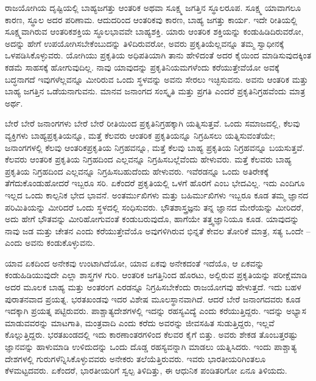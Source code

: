 \vskip 5pt

ರಾಜಯೋಗಿಯ ದೃಷ್ಟಿಯಲ್ಲಿ ಬಾಹ್ಯಜಗತ್ತು ಆಂತರಿಕ ಅಥವಾ ಸೂಕ್ಷ್ಮ ಜಗತ್ತಿನ ಸ್ಥೂಲರೂಪ. ಸೂಕ್ಷ್ಮ ಯಾವಾಗಲೂ ಕಾರಣ, ಸ್ಥೂಲ ಅದರ ಪರಿಣಾಮ. ಆದುದರಿಂದ ಆಂತರಿಕವು ಕಾರಣ, ಬಾಹ್ಯ ಜಗತ್ತು ಕಾರ್ಯ. ಇದೇ ರೀತಿಯಲ್ಲಿ ಸೂಕ್ಷ್ಮವಾಗಿರುವ ಆಂತರಿಕಶಕ್ತಿಯ ಸ್ಥೂಲಭಾವವೇ ಬಾಹ್ಯಶಕ್ತಿ. ಯಾರು ಆಂತರಿಕ ಶಕ್ತಿಯನ್ನು ಕಂಡುಹಿಡಿದಿರುವರೋ, ಅದನ್ನು ಹೇಗೆ ಉಪಯೋಗಿಸಬೇಕೆಂಬುದನ್ನು ತಿಳಿದಿರುವರೋ, ಅವರು ಪ್ರಕೃತಿಯೆಲ್ಲವನ್ನೂ ತಮ್ಮ ಸ್ವಾಧೀನಕ್ಕೆ ಒಳಪಡಿಸಿಕೊಳ್ಳುವರು. ಯೋಗಿಯು ಪ್ರಕೃತಿಯ ಅಧಿಪತಿಯಾಗಿ ತಾನು ಹೇಳಿದಂತೆ ಅದರ ಕೈಯಿಂದ ಮಾಡಿಸುವುದಕ್ಕಿಂತ ಕಡಮೆ ಸಾಹಸಕ್ಕೆ ಹೋಗುವುದಿಲ್ಲ. ನಾವು ಯಾವುದನ್ನು ಪ್ರಕೃತಿನಿಯಮಗಳೆಂದು ಕರೆಯುತ್ತೇವೆಯೋ ಅವಕ್ಕೆ ಬದ್ಧನಾಗದೆ ಇವುಗಳೆಲ್ಲವನ್ನೂ ಮೀರಿರುವ ಒಂದು ಸ್ಥಳವನ್ನು ಅವನು ಸೇರಲು ಇಚ್ಛಿಸುವನು. ಅವನು ಆಂತರಿಕ ಮತ್ತು ಬಾಹ್ಯ ಜಗತ್ತಿನ ಒಡೆಯನಾಗುವನು. ಮಾನವ ಜನಾಂಗದ ಸಂಸ್ಕೃತಿ ಮತ್ತು ಪ್ರಗತಿ ಎಂದರೆ ಪ್ರಕೃತಿನಿಗ್ರಹವೆಂದು ಮಾತ್ರ ಅರ್ಥ. 

\vskip 6pt

ಬೇರೆ ಬೇರೆ ಜನಾಂಗಗಳು ಬೇರೆ ಬೇರೆ ರೀತಿಯಿಂದ ಪ್ರಕೃತಿನಿಗ್ರಹಕ್ಕಾಗಿ ಯತ್ನಿಸುತ್ತವೆ. ಒಂದು ಸಮಾಜದಲ್ಲಿ, ಕೆಲವು ವ್ಯಕ್ತಿಗಳು ಬಾಹ್ಯಪ್ರಕೃತಿಯನ್ನೂ, ಮತ್ತೆ ಕೆಲವರು ಆಂತರಿಕ ಪ್ರಕೃತಿಯನ್ನೂ ನಿಗ್ರಹಿಸಲು ಯತ್ನಿಸುವಂತೆಯೇ; ಜನಾಂಗಗಳಲ್ಲಿ ಕೆಲವು ಆಂತರಿಕಪ್ರಕೃತಿಯ ನಿಗ್ರಹವನ್ನೂ, ಮತ್ತೆ ಕೆಲವು ಬಾಹ್ಯ ಪ್ರಕೃತಿಯ ನಿಗ್ರಹವನ್ನೂ ಬಯಸುತ್ತವೆ. ಕೆಲವರು ಆಂತರಿಕ ಪ್ರಕೃತಿಯ ನಿಗ್ರಹದಿಂದ ಎಲ್ಲವನ್ನೂ ನಿಗ್ರಹಿಸಬಲ್ಲೆವೆಂದು ಹೇಳುವರು. ಮತ್ತೆ ಕೆಲವರು ಬಾಹ್ಯ ಪ್ರಕೃತಿಯ ನಿಗ್ರಹದಿಂದ ಎಲ್ಲವನ್ನೂ ನಿಗ್ರಹಿಸಬಹುದೆಂದು ಹೇಳುವರು. ಇವೆರಡನ್ನೂ ಒಂದು ಅತಿರೇಕಕ್ಕೆ ತೆಗೆದುಕೊಂಡುಹೋದರೆ ಇಬ್ಬರೂ ಸರಿ. ಏಕೆಂದರೆ ಪ್ರಕೃತಿಯಲ್ಲಿ ಒಳಗೆ ಹೊರಗೆ ಎಂಬ ಭೇದವಿಲ್ಲ. ಇದು ಎಂದಿಗೂ ಇಲ್ಲದ ಒಂದು ಕಾಲ್ಪನಿಕ ಭೇದ ಭಾವನೆ. ಅಂತರ್ಮುಖಿಗಳು ಮತ್ತು ಬಹಿರ್ಮುಖಿಗಳು ಇಬ್ಬರೂ ಕೂಡ ತಮ್ಮ ಜ್ಞಾನದ ಪರಿಮಿತಿಯನ್ನು ಮೀರಿದರೆ ಒಂದು ಸ್ಥಳದಲ್ಲಿ ಸಂಧಿಸುವರು. ಭೌತಶಾಸ್ತ್ರಜ್ಞನು ತನ್ನ ಜ್ಞಾನದ ಮೇರೆಯನ್ನು ಮೀರಿದರೆ, ಅದು ಹೇಗೆ ಭೌತವನ್ನು ಮೀರಿಹೋಗುವಂತೆ ಕಂಡುಬರುವುದೊ, ಹಾಗೆಯೇ ತತ್ತ್ವಜ್ಞಾನಿಯೂ ಕೂಡ. ಯಾವುದನ್ನು ನಾವು ಜಡ ಮತ್ತು ಚೇತನ ಎಂದು ಕರೆಯುತ್ತೇವೆಯೊ ಅವುಗಳಿಗಿರುವ ಭಿನ್ನತೆ ಕೇವಲ ತೋರಿಕೆ ಮಾತ್ರ, ಸತ್ಯ ಒಂದೇ – ಎಂದು ಅವನು ಕಂಡುಕೊಳ್ಳುವನು. 

\vskip 6pt

ಯಾವ ಏಕದಿಂದ ಅನೇಕವು ಉಂಟಾಗಿದೆಯೋ, ಯಾವ ಏಕವು ಅನೇಕದಂತೆ ಇದೆಯೊ, ಆ ಏಕವನ್ನು ಕಂಡುಹಿಡಿಯುವುದೇ ಎಲ್ಲಾ ಶಾಸ್ತ್ರಗಳ ಗುರಿ. ಆಂತರಿಕ ಜಗತ್ತಿನಿಂದ ಹೊರಟು, ಅಲ್ಲಿರುವ ಪ್ರಕೃತಿಯನ್ನು ಪರೀಕ್ಷೆಮಾಡಿ ಅದರ ಮೂಲಕ ಬಾಹ್ಯ ಮತ್ತು ಅಂತರಂಗ ಎರಡನ್ನೂ ನಿಗ್ರಹಿಸಬೇಕೆಂದು ರಾಜಯೋಗವು ಹೇಳುತ್ತದೆ. ಇದು ಬಹಳ ಪುರಾತನವಾದ ಪ್ರಯತ್ನ. ಭರತಖಂಡವು ಇದರ ವಿಶೇಷ ಮೂಲಸ್ಥಾನವಾಗಿದೆ. ಆದರೆ ಬೇರೆ ಜನಾಂಗದವರು ಕೂಡ ಇದಕ್ಕಾಗಿ ಪ್ರಯತ್ನ ಪಟ್ಟಿರುವರು. ಪಾಶ್ಚಾತ್ಯದೇಶಗಳಲ್ಲಿ ಇದನ್ನು ರಹಸ್ಯವಿದ್ಯೆ ಎಂದು ಕರೆಯುತ್ತಿದ್ದರು. ಇದನ್ನು ಅಭ್ಯಾಸ ಮಾಡುವವರನ್ನು ಮಾಟಗಾತಿ, ಮಂತ್ರವಾದಿ ಎಂದು ಕರೆದು ಅವರನ್ನು ಜೀವಸಹಿತ ಸುಡುತ್ತಿದ್ದರು, ಇಲ್ಲವೆ ಕೊಲ್ಲುತ್ತಿದ್ದರು. ಭರತಖಂಡದಲ್ಲಿ ಇದು ಕಾರಣಾಂತರಗಳಿಂದ ಕೆಲವರ ಕೈಗೆ ಬಿತ್ತು. ಅವರು ಶೇಕಡ ತೊಂಬತ್ತರಷ್ಟು ಜ್ಞಾನವನ್ನು ಹಾಳುಮಾಡಿ ಉಳಿದುದನ್ನು ಒಂದು ದೊಡ್ಡ ರಹಸ್ಯವನ್ನಾಗಿ ಮಾಡಲು ಯತ್ನಿಸಿದರು. ಇಂದು ಪಾಶ್ಚಾತ್ಯ ದೇಶಗಳಲ್ಲಿ ಗುರುಗಳೆನ್ನಿಸಿಕೊಳ್ಳುವವರು ಅನೇಕರು ತಲೆಯೆತ್ತಿರುವರು. ಇವರು ಭಾರತೀಯರಿಗಿಂತಲೂ ಕೆಳಮಟ್ಟದವರು. ಏಕೆಂದರೆ, ಭಾರತೀಯರಿಗೆ ಸ್ವಲ್ಪ ತಿಳಿದಿತ್ತು, ಈ ಆಧುನಿಕ ಪಂಡಿತರಿಗೋ ಏನೂ ತಿಳಿಯದು. 


